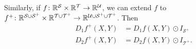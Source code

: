 Similarly, if $f \colon \mathbb{R}^\mathcal{S} \times \mathbb{R}^\mathcal{T} \rightarrow \mathbb{R}^\mathcal{U}$, we can extend $f$ to $f^+ \colon \mathbb{R}^\mathcal{S \cup S^+} \times \mathbb{R}^\mathcal{T \cup T^+} \rightarrow \mathbb{R}^\mathcal{U \cup S^+ \cup T^+}$. Then
\begin{align*}
  D_1 f^+(X, Y) &= D_1 f(X, Y) \odot I_{\mathcal{S}^+} \\
  D_2 f^+(X, Y) &= D_2 f(X, Y) \odot I_{\mathcal{T}^+}.
\end{align*}

